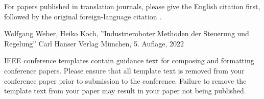 \documentclass[conference]{IEEEtran}
\begin{document}
For papers published in translation journals, please give the English 
citation first, followed by the original foreign-language citation \cite{b6}.

\begin{thebibliography}{00}
     Wolfgang Weber, Heiko Koch, ''Industrieroboter Methoden der Steuerung und Regelung'' Carl Hanser Verlag München, 5. Auflage, 2022

\end{thebibliography} 
\vspace{12pt}
\color{red}
IEEE conference templates contain guidance text for composing and formatting conference papers. Please ensure that all template text is removed from your conference paper prior to submission to the conference. Failure to remove the template text from your paper may result in your paper not being published.
\end{document}
